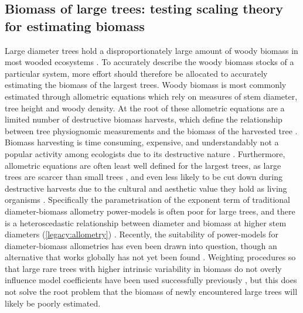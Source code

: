 \begin{refsection}
\subsection{Biomass of large trees: testing scaling theory for estimating biomass}
\label{legacy:ssec:scaling}

Large diameter trees hold a disproportionately large amount of woody biomass in most wooded ecosystems \citep{Bastin2015, Lutz2018}. To accurately describe the woody biomass stocks of a particular system, more effort should therefore be allocated to accurately estimating the biomass of the largest trees. Woody biomass is most commonly estimated through allometric equations which rely on measures of stem diameter, tree height and woody density. At the root of these allometric equations are a limited number of destructive biomass harvests, which define the relationship between tree physiognomic measurements and the biomass of the harvested tree \citep{Chave2005}. Biomass harvesting is time consuming, expensive, and understandably not a popular activity among ecologists due to its destructive nature \citep{Roxburgh2015}. Furthermore, allometric equations are often least well defined for the largest trees, as large trees are scarcer than small trees \citep{Lutz2018, Lindenmayer2012}, and even less likely to be cut down during destructive harvests due to the cultural and aesthetic value they hold as living organisms \citep{Blicharska2014}. Specifically the parametrisation of the exponent term of traditional diameter-biomass allometry power-models is often poor for large trees, and there is a heteroscedastic relationship between diameter and biomass at higher stem diameters (\autoref{legacy:allometry}) \citep{Chave2004, Chave2014}. Recently, the suitability of power-models for diameter-biomass allometries has even been drawn into question, though an alternative that works globally has not yet been found \citep{Picard2015}. Weighting procedures so that large rare trees with higher intrinsic variability in biomass do not overly influence model coefficients have been used successfully previously \citep{Chave2014, McNicol2015b}, but this does not solve the root problem that the biomass of newly encountered large trees will likely be poorly estimated. 


\end{refsection}

